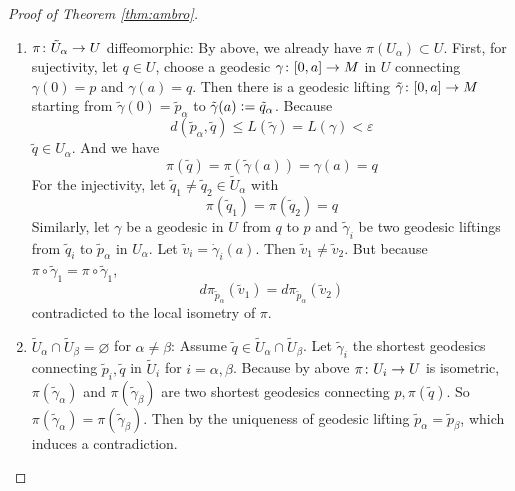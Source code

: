 \begin{enumerate}[label=\arabic{*}.]
\begin{proof}[Proof of Theorem \ref{thm:ambro}]
\begin{enumerate}[label=(\arabic{*})]
\begin{enumerate}[label=\Roman*.]
				\item $\pi \colon \tilde{U}_\alpha \rightarrow U$ diffeomorphic: By above, we already have $\pi(U_\alpha) \subset U$. First, for sujectivity, let $q \in U$, choose a geodesic $\gamma \colon [0,a] \rightarrow M$ in $U$ connecting $\gamma(0) = p$ and $\gamma(a) = q$. Then there is a geodesic lifting $\tilde{\gamma} \colon [0,a] \rightarrow M$ starting from $\tilde{\gamma}(0) = \tilde{p}_\alpha$ to $\tilde{\gamma}(a) \vcentcolon= \tilde{q}_\alpha$. Because
				\begin{equation*}
					d(\tilde{p}_\alpha,\tilde{q}) \leq L(\tilde{\gamma}) = L(\gamma) < \varepsilon
				\end{equation*}
				$\tilde{q} \in U_\alpha$. And we have
				\begin{equation*}
					\pi(\tilde{q}) = \pi(\tilde{\gamma}(a)) = \gamma(a) = q
				\end{equation*}
				For the injectivity, let $\tilde{q}_1 \neq \tilde{q}_2 \in \tilde{U}_\alpha$ with 
				\begin{equation*}
					\pi(\tilde{q}_1) = \pi(\tilde{q}_2) = q
				\end{equation*}
				Similarly, let $\gamma$ be a geodesic in $U$ from $q$ to $p$ and $\tilde{\gamma}_i$ be two geodesic liftings from $\tilde{q}_i$ to $\tilde{p}_\alpha$ in $U_\alpha$. Let $\tilde{v}_i = \dot{\gamma}_i(a)$. Then $\tilde{v}_1 \neq \tilde{v}_2$. But because $\pi \circ \tilde{\gamma}_1 =\pi \circ \tilde{\gamma}_1$,
				\begin{equation*}
					d\pi_{\tilde{p}_\alpha}(\tilde{v}_1) = d\pi_{\tilde{p}_\alpha}(\tilde{v}_2)
				\end{equation*}
				contradicted to the local isometry of $\pi$.

				\item $\tilde{U}_\alpha \cap \tilde{U}_\beta = \varnothing$ for $\alpha \neq \beta$: Assume $\tilde{q} \in \tilde{U}_\alpha \cap \tilde{U}_\beta$. Let $\tilde{\gamma}_i$ the shortest geodesics connecting $\tilde{p}_i,\tilde{q}$ in $\tilde{U}_i$ for $i = \alpha,\beta$. Because by above $\pi \colon U_i \rightarrow U$ is isometric, $\pi(\tilde{\gamma}_\alpha)$ and $\pi(\tilde{\gamma}_\beta)$ are two shortest geodesics connecting $p,\pi(\tilde{q})$. So $\pi(\tilde{\gamma}_\alpha) = \pi(\tilde{\gamma}_\beta)$. Then by the uniqueness of geodesic lifting $\tilde{p}_\alpha = \tilde{p}_\beta$, which induces a contradiction.\qedhere
			\end{enumerate}
		\end{enumerate}
	\end{proof}
\end{enumerate}